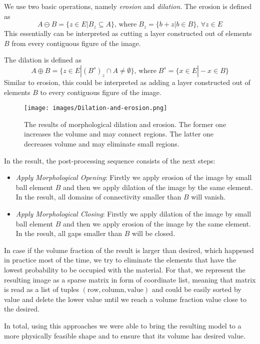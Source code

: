 We use two basic operations, namely \emph{erosion} and \emph{dilation}\cite{bibl:er-dil}.
The erosion is defined as 
\begin{equation}
A \ominus B = \{z \in E | B_{z} \subseteq A \}, \, \mathrm{where} \; B_{z}=\{ b+z | b \in B \}, \, \forall z \in E 
\end{equation} 
This essentially can be interpreted as cutting a layer constructed out of elements $B$ from every contiguous figure of the image.
\medskip

The dilation is defined as 
\begin{equation}
A \oplus B = \{z \in E | (B^{s})_{z} \cap  A \neq \emptyset \}, \, \mathrm{where} \; B^{s}=\{x \in E | -x \in B \}
\end{equation} 
Similar to erosion, this could be interpreted as adding a layer constructed out of elements $B$ to every contiguous figure of the image. 
\medskip
\begin{figure}[h]
	\centering
	\texttt{[image: images/Dilation-and-erosion.png]}
	\label{fig:dil-eros}
	\caption{The results of morphological dilation and erosion. The former one increases the volume and may connect regions. The latter one decreases volume and may eliminate small regions.}
\end{figure}
\medskip

In the result, the post-processing sequence consists of the next steps:
\begin{itemize}
	\item \emph{Apply Morphological Opening}: Firstly we apply erosion of the image by small ball element $B$ and then we apply dilation of the image by the same element. In the result, all domains of connectivity smaller than $B$ will vanish.
	\item \emph{Apply Morphological Closing}: Firstly we apply dilation of the image by small ball element $B$ and then we apply erosion of the image by the same element. In the result, all gaps smaller than $B$ will be closed.
\end{itemize}
\medskip

In case if the volume fraction of the result is larger than desired, which happened in practice most of the time, we try to eliminate the elements that have the lowest probability to be occupied with the material.
For that, we represent the resulting image as a sparse matrix in form of coordinate list, meaning that matrix is read as a list of tuples $(\mathrm{row},\mathrm{column},\mathrm{value})$ and could be easily sorted by value and delete the lower value until we reach a volume fraction value close to the desired.
\medskip

In total, using this approaches we were able to bring the resulting model to a more physically feasible shape and to ensure that its volume has desired value.
\medskip
{}
